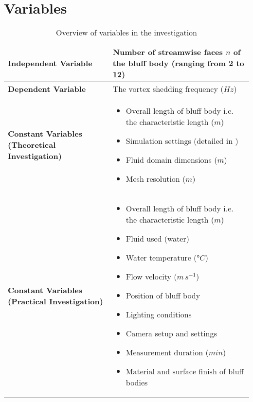 \section{Variables}

\begin{table}[H]
	\centering
	\renewcommand{\arraystretch}{1.3}
	\begin{tabularx}{\textwidth}{|>{\raggedright\arraybackslash}p{5.2cm}|X|}
		\hline
		\textbf{Independent Variable} & Number of streamwise faces $n$ of the bluff body (ranging from 2 to 12) \\
		\hline
		\textbf{Dependent Variable} & The vortex shedding frequency ($Hz$) \\
		\hline
		\textbf{Constant Variables (Theoretical Investigation)} &
		\begin{itemize}[leftmargin=1.5em, itemsep=2pt, topsep=0pt, label=--]
			\item Overall length of bluff body i.e. the characteristic length ($m$)
			\item Simulation settings (detailed in \Cref{sec:simulationSettings})
			\item Fluid domain dimensions ($m$)
			\item Mesh resolution ($m$)
		\end{itemize} \\
		\hline
		\textbf{Constant Variables (Practical Investigation)} &
		\begin{itemize}[leftmargin=1.5em, itemsep=2pt, topsep=0pt, label=--]
			\item Overall length of bluff body i.e. the characteristic length ($m$)
			\item Fluid used (water)
			\item Water temperature ($°C$)
			\item Flow velocity ($m\,s^{-1}$)
			\item Position of bluff body
			\item Lighting conditions
			\item Camera setup and settings
			\item Measurement duration ($min$)
			\item Material and surface finish of bluff bodies
		\end{itemize} \\
		\hline
	\end{tabularx}
	\caption{Overview of variables in the investigation}
	\label{tab:variables}
\end{table}

